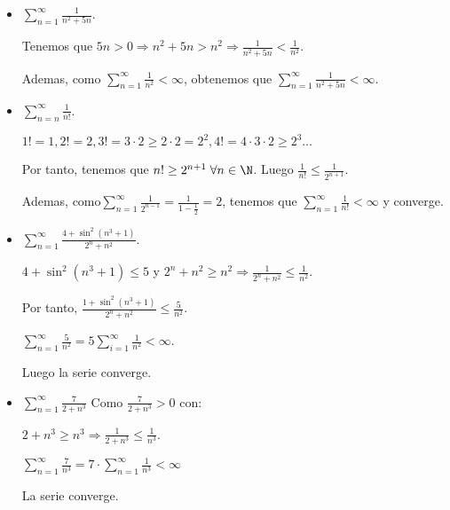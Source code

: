 \vspace{0.7cm}
\begin{example}
	\begin{itemize}
		\item \(\sum_{n =1}^{\infty} \frac{1}{n^{2} + 5n }\).
		      
		      Tenemos que \(5n > 0 \Rightarrow n^{2} + 5n > n^{2} \Rightarrow \frac{1}{n^{2} + 5n } < \frac{1}{n^{2} }  \).
		      
		      Ademas, como \(\sum_{n =1}^{\infty} \frac{1}{n^{2} } < \infty\), obtenemos que \(\sum_{n =1}^{\infty} \frac{1}{n^{2} + 5n } < \infty \).
		\item \(\sum_{n  =n }^{\infty} \frac{1}{n! }\).
		      
		      \(1! = 1, 2! = 2, 3! = 3 \cdot 2 \geq 2 \cdot 2 = 2^{2}, 4! = 4 \cdot 3 \cdot 2 \geq 2^{3} \ldots\)
		      
		      Por tanto, tenemos que \(n! \geq 2^{n+1} \; \forall n \in \N\). Luego \(\frac{1}{n!} \leq \frac{1}{2^{n+1} }\).
		      
		      Ademas, como\(\sum_{n =1}^{\infty} \frac{1}{2^{n-1} } = \frac{1}{1 - \frac{1}{2}} = 2\), tenemos que \(\sum_{n =1}^{\infty} \frac{1}{n!} < \infty \) y converge.
		      
		\item \(\sum_{n =1}^{\infty} \frac{4 + \sin^{2}  (n^{3} +1 )}{2^{n} + n^{2}  }\).
		      
		      \( 4 + \sin^{2}(n^{3} + 1 ) \leq 5  \) y \(2^{n} + n^{2} \geq n^{2} \Rightarrow \frac{1}{2^{n} + n^{2}  } \leq \frac{1}{n^{2} }   \).
		      
		      Por tanto, \(\frac{1 + \sin^{2}(n^{3} +1 )}{2^{n} + n^{2}  } \leq \frac{5}{n^{2} }\).
		      
		      \(\sum_{n =1}^{\infty} \frac{5}{n^{2} } = 5 \sum_{i=1}^{\infty} \frac{1}{n^{2} } < \infty\).
		      
		      Luego la serie converge.
		      
		\item \(\sum_{n =1}^{\infty} \frac{7 }{2 + n^{3 } }\)
		      Como \(\frac{7}{2 + n^{3} } > 0 \) con:
		      
		      \(2 + n^{3} \geq n^{3} \Rightarrow \frac{1}{2 + n^{3} } \leq \frac{1}{n^{3} }\).
		      
		      \(\sum_{n =1}^{\infty} \frac{7}{n^{3} } = 7 \cdot \sum_{n =1}^{\infty} \frac{1}{n^{3} } < \infty\)
		      
		      La serie converge.
		      

\end{itemize}
\end{example}
